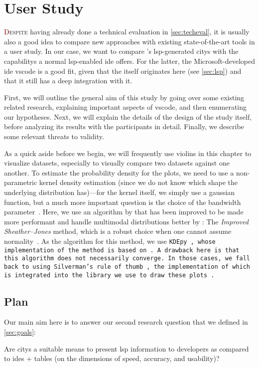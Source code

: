 \documentclass[../thesis]{subfiles}
\begin{document}
\chapter{User Study}\label{ch:evaluation}

\lettrine[lines=3]{\textcolor{Maroon}{D}}{espite} having already done a technical evaluation in \cref{sec:techeval}, it is usually also a good idea to compare new approaches with existing state-of-the-art tools in a user study.
In our case, we want to compare \SEE{}'s \gls{lsp}-generated \glspl{city} with the \glspl{capability} a normal \gls{lsp}-enabled \gls{ide} offers.
For the latter, the Microsoft-developed \gls{ide} \gls{vscode} is a good fit, given that the  itself originates here (see \cref{sec:lsp}) and that it still has a deep integration with it.

First, we will outline the general aim of this study by going over some existing related research, explaining important aspects of \gls{vscode}, and then enumerating our hypotheses.
Next, we will explain the details of the design of the study itself, before analyzing its results with the \participants{} participants in detail.
Finally, we describe some relevant threats to validity.

As a quick aside before we begin, we will frequently use \glspl{violin} in this chapter to visualize datasets, especially to visually compare two datasets against one another.
To estimate the probability density for the plots, we need to use a non-parametric kernel density estimation (since we do not know which shape the underlying distribution has)---for the kernel itself, we simply use a gaussian function, but a much more important question is the choice of the bandwidth parameter~\cite{heidenreich2013}.
Here, we use an algorithm by \textcite{sheather1991} that has been improved to be made more performant and handle multimodal distributions better by \textcite{botev2010a}:
The \emph{Improved Sheather--Jones} method, which is a robust choice when one cannot assume normality~\cite{akinshin2020}.
As the algorithm for this method, we use \tt{KDEpy}~\cite{odland2018}, whose implementation of the method is based on \textcite[326--328]{kroese2011}.
A drawback here is that this algorithm does not necessarily converge.
In those cases, we fall back to using Silverman's rule of thumb~\cite{silverman1986}, the implementation of which is integrated into the library we use to draw these plots~\cite{callil-soares2024}.

\section{Plan}\label{sec:plan}
Our main aim here is to answer our second research question that we defined in \cref{sec:goals}:
\begin{displayquote}
	Are \glspl{city} a suitable means to present \gls{lsp} information to developers as compared to \glspl{ide} + tables (on the dimensions of speed, accuracy, and usability)?
\end{displayquote}
\end{document}
